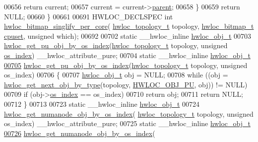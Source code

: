\begin{DoxyCode}
00656       \textcolor{keywordflow}{return} current;
00657     current = current->\hyperlink{a00238_adc494f6aed939992be1c55cca5822900}{parent};
00658   \}
00659   \textcolor{keywordflow}{return} NULL;
00660 \}
00661 
00691 HWLOC\_DECLSPEC \textcolor{keywordtype}{int} \hyperlink{a00200_ga050646458efc8ca1120d9f124c5ad861}{hwloc\_bitmap\_singlify\_per\_core}(
      \hyperlink{a00186_ga9d1e76ee15a7dee158b786c30b6a6e38}{hwloc\_topology\_t} topology, \hyperlink{a00205_gaa3c2bf4c776d603dcebbb61b0c923d84}{hwloc\_bitmap\_t} \hyperlink{a00238_a67925e0f2c47f50408fbdb9bddd0790f}{cpuset}, \textcolor{keywordtype}{unsigned} which);
00692 
00702 \textcolor{keyword}{static} \_\_hwloc\_inline \hyperlink{a00238}{hwloc\_obj\_t}
00703 \hyperlink{a00200_ga751c238a4931db5cc0ca3181b7dd7479}{hwloc\_get\_pu\_obj\_by\_os\_index}(\hyperlink{a00186_ga9d1e76ee15a7dee158b786c30b6a6e38}{hwloc\_topology\_t} topology, \textcolor{keywordtype}{
      unsigned} \hyperlink{a00238_a61a7a80a68eaccbaaa28269e678c81a9}{os\_index}) \_\_hwloc\_attribute\_pure;
00704 \textcolor{keyword}{static} \_\_hwloc\_inline \hyperlink{a00238}{hwloc\_obj\_t}
\hyperlink{a00200_ga751c238a4931db5cc0ca3181b7dd7479}{00705} \hyperlink{a00200_ga751c238a4931db5cc0ca3181b7dd7479}{hwloc\_get\_pu\_obj\_by\_os\_index}(\hyperlink{a00186_ga9d1e76ee15a7dee158b786c30b6a6e38}{hwloc\_topology\_t} topology, \textcolor{keywordtype}{
      unsigned} os\_index)
00706 \{
00707   \hyperlink{a00238}{hwloc\_obj\_t} obj = NULL;
00708   \textcolor{keywordflow}{while} ((obj = \hyperlink{a00187_ga759e88eaf5a230ad283e9d4c42486735}{hwloc\_get\_next\_obj\_by\_type}(topology, 
      \hyperlink{a00184_ggacd37bb612667dc437d66bfb175a8dc55abca6887e80cb291353b0a0c1da83f661}{HWLOC\_OBJ\_PU}, obj)) != NULL)
00709     \textcolor{keywordflow}{if} (obj->\hyperlink{a00238_a61a7a80a68eaccbaaa28269e678c81a9}{os\_index} == os\_index)
00710       \textcolor{keywordflow}{return} obj;
00711   \textcolor{keywordflow}{return} NULL;
00712 \}
00713 
00723 \textcolor{keyword}{static} \_\_hwloc\_inline \hyperlink{a00238}{hwloc\_obj\_t}
00724 \hyperlink{a00200_gab89d9ed9edfaa3dd526fb6ee1a1618ea}{hwloc\_get\_numanode\_obj\_by\_os\_index}(
      \hyperlink{a00186_ga9d1e76ee15a7dee158b786c30b6a6e38}{hwloc\_topology\_t} topology, \textcolor{keywordtype}{unsigned} os\_index) \_\_hwloc\_attribute\_pure;
00725 \textcolor{keyword}{static} \_\_hwloc\_inline \hyperlink{a00238}{hwloc\_obj\_t}
\hyperlink{a00200_gab89d9ed9edfaa3dd526fb6ee1a1618ea}{00726} \hyperlink{a00200_gab89d9ed9edfaa3dd526fb6ee1a1618ea}{hwloc\_get\_numanode\_obj\_by\_os\_index}(

\end{DoxyCode}

